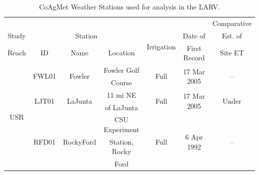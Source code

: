 \begin{table}[htb]
  \centering
  \caption[CoAgMet Weather Stations used for analysis in the LARV.]{CoAgMet Weather Stations used for analysis in the LARV.}
  \label{tab:CoAgMet}
    \begin{tabular}{ccccccc}
    	\toprule
    	                         &                           &                                &                &                             &                                 &        Comparative        \\
    	         Study           &                        \multicolumn{3}{c}{Station }                         & \multirow{2}{*}{Irrigation} &             Date of             &          Est. of          \\
    	\cmidrule{2-4}
    Reach &            ID             &              Name              &    Location    &                             &          First Record           &          Site ET          \\ \toprule
    	\multirow{7}[0]{*}{USR}  & \multirow{2}[0]{*}{FWL01} &   \multirow{2}[0]{*}{Fowler}   &  Fowler Golf   &  \multirow{2}[0]{*}{Full}   & \multirow{2}[0]{*}{17 Mar 2005} &  \multirow{2}[0]{*}{--}   \\
    	                         &                           &                                &     Course     &                             &                                 &  \\
    	     \cmidrule{2-7}      & \multirow{2}[0]{*}{LJT01} &  \multirow{2}[0]{*}{LaJunta}   &    11 mi NE    &  \multirow{2}[0]{*}{Full}   & \multirow{2}[0]{*}{17 Mar 2005} & \multirow{2}[0]{*}{Under} \\
    	                         &                           &                                &   of LaJunta   &                             &                                 &  \\
    	     \cmidrule{2-7}      & \multirow{3}[0]{*}{RFD01} & \multirow{3}[0]{*}{RockyFord}  & CSU Experiment &  \multirow{3}[0]{*}{Full}   & \multirow{3}[0]{*}{6 Apr 1992}  &  \multirow{3}[0]{*}{--}   \\
    	                         &                           &                                & Station, Rocky &                             &                                 &  \\
    	                         &                           &                                &      Ford      &                             &                                 &  \\ \toprule

\end{tabular}
\end{table}
